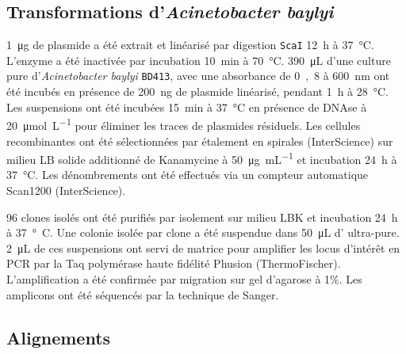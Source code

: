 \subsection{Transformations d'\emph{Acinetobacter baylyi}}
\label{subsec:transfo}

\si{1\ug} de plasmide a été extrait et linéarisé par digestion \texttt{ScaI}
\si{12\hour} à \si{37\celsius}. L'enzyme a été inactivée par incubation
\si{10\minute} à \si{70\celsius}. \si{390\uL} d'une culture pure
d'\emph{Acinetobacter baylyi} \texttt{BD413}, avec une absorbance de \si{0,8} à
\si{600\nm} ont été incubés en présence de \si{200\ng} de plasmide linéarisé,
pendant \si{1\hour} à \si{28\celsius}. Les suspensions ont été incubées
\si{15\minute} à \si{37\celsius} en présence de DNAse à \SI{20}{\umol\per\L} pour
éliminer les traces de plasmides résiduels. Les cellules recombinantes ont été
sélectionnées par étalement en spirales (InterScience) sur milieu LB solide
additionné de Kanamycine à \SI{50}{\ug\per\mL} et incubation \SI{24}{\hour} à
\SI{37}{\celsius}. Les dénombrements ont été effectués via un compteur
automatique Scan\textsuperscript{\textregistered}1200 (InterScience).

96 clones isolés ont été purifiés par isolement sur milieu LBK et incubation
\SI{24}{\hour} à \si{37°C}. Une colonie isolée par clone a été suspendue dans
\SI{50}{\uL} d' ultra-pure. \SI{2}{\uL} de ces suspensions ont servi de
matrice pour amplifier les locus d'intérêt en PCR par la Taq polymérase
haute fidélité Phusion (ThermoFischer). L'amplification a été confirmée par
migration sur gel d'agarose à 1\%. Les amplicons ont été séquencés par la
technique de Sanger.

\subsection{Alignements}
\label{subsec:align}


